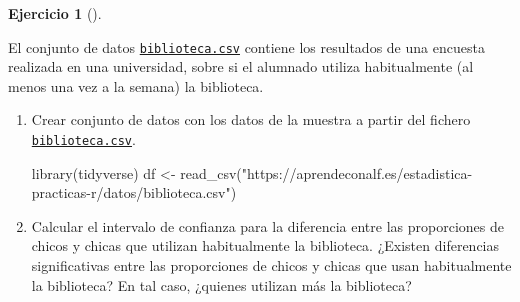 \documentclass[
  a4paper,
]{scrreport}
\newenvironment{Shaded}{\begin{snugshade}}{\end{snugshade}}
\newcommand{\FunctionTok}[1]{\textcolor[rgb]{0.28,0.35,0.67}{#1}}
\newcommand{\NormalTok}[1]{\textcolor[rgb]{0.00,0.23,0.31}{#1}}
\newcommand{\OtherTok}[1]{\textcolor[rgb]{0.00,0.23,0.31}{#1}}
\newcommand{\StringTok}[1]{\textcolor[rgb]{0.13,0.47,0.30}{#1}}
\theoremstyle{definition}
\newtheorem{exercise}{Ejercicio}[chapter]
\theoremstyle{remark}
\begin{document}
\begin{exercise}[]\protect\hypertarget{exr-intervalo-comparacion-proporciones-uso-biblioteca}{}\label{exr-intervalo-comparacion-proporciones-uso-biblioteca}

El conjunto de datos
\href{https://aprendeconalf.es/estadistica-practicas-r/datos/biblioteca.csv}{\texttt{biblioteca.csv}}
contiene los resultados de una encuesta realizada en una universidad,
sobre si el alumnado utiliza habitualmente (al menos una vez a la
semana) la biblioteca.

\begin{enumerate}
\def\labelenumi{\alph{enumi}.}
\item
  Crear conjunto de datos con los datos de la muestra a partir del
  fichero
  \href{https://aprendeconalf.es/estadistica-practicas-r/datos/biblioteca.csv}{\texttt{biblioteca.csv}}.

  \begin{tcolorbox}[enhanced jigsaw, breakable, toptitle=1mm, colbacktitle=quarto-callout-tip-color!10!white, rightrule=.15mm, opacityback=0, opacitybacktitle=0.6, titlerule=0mm, coltitle=black, colframe=quarto-callout-tip-color-frame, colback=white, bottomtitle=1mm, leftrule=.75mm, toprule=.15mm, title=\textcolor{quarto-callout-tip-color}{\faLightbulb}\hspace{0.5em}{Solución}, arc=.35mm, bottomrule=.15mm, left=2mm]

\begin{Shaded}
\begin{Highlighting}[]
\FunctionTok{library}\NormalTok{(tidyverse)}
\NormalTok{df }\OtherTok{\textless{}{-}} \FunctionTok{read\_csv}\NormalTok{(}\StringTok{"https://aprendeconalf.es/estadistica{-}practicas{-}r/datos/biblioteca.csv"}\NormalTok{)}
\end{Highlighting}
\end{Shaded}

  \end{tcolorbox}
\item
  Calcular el intervalo de confianza para la diferencia entre las
  proporciones de chicos y chicas que utilizan habitualmente la
  biblioteca. ¿Existen diferencias significativas entre las proporciones
  de chicos y chicas que usan habitualmente la biblioteca? En tal caso,
  ¿quienes utilizan más la biblioteca?

  \begin{tcolorbox}[enhanced jigsaw, breakable, toptitle=1mm, colbacktitle=quarto-callout-tip-color!10!white, rightrule=.15mm, opacityback=0, opacitybacktitle=0.6, titlerule=0mm, coltitle=black, colframe=quarto-callout-tip-color-frame, colback=white, bottomtitle=1mm, leftrule=.75mm, toprule=.15mm, title=\textcolor{quarto-callout-tip-color}{\faLightbulb}\hspace{0.5em}{Solución}, arc=.35mm, bottomrule=.15mm, left=2mm]


\end{tcolorbox}
\end{enumerate}
\end{exercise}
\end{document}
